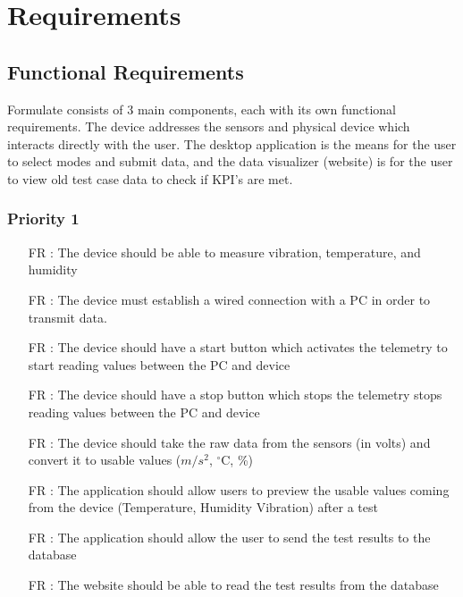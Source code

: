 \documentclass[12pt]{article}
\newcounter{reqnum} %
\begin{document}
  \newpage

\section{Requirements}

\subsection{Functional Requirements}
Formulate consists of 3 main components, each with its own functional requirements. The device addresses the sensors and physical device which interacts directly with the user. The desktop application is the means for the user to select modes and submit data, and the data visualizer (website) is for the user to view old test case data to check if KPI's are met.



\subsubsection{Priority 1} 

\begin{itemize}
  
  \item[FR \refstepcounter{reqnum}\thereqnum:] The device should be able to measure vibration, temperature, and humidity
  
  \item[FR \refstepcounter{reqnum}\thereqnum:] The device must establish a wired connection with a PC in order to transmit data.
  
  \item[FR \refstepcounter{reqnum}\thereqnum:] The device should have a start button which activates the telemetry to start reading values between the PC and device 
  
  \item[FR \refstepcounter{reqnum}\thereqnum:] The device should have a stop button which stops the telemetry stops reading values between the PC and device
  
  \item[FR \refstepcounter{reqnum}\thereqnum:] The device should take the raw data from the sensors (in volts) and convert it to usable values ($m/s^2$, $^\circ$C, \%)
  
  \item[FR \refstepcounter{reqnum}\thereqnum:] The application should allow users to preview the usable values coming from the device (Temperature, Humidity Vibration) after a test

  \item[FR \refstepcounter{reqnum}\thereqnum:] The application should allow the user to send the test results to the database
  
  \item[FR \refstepcounter{reqnum}\thereqnum:] The website should be able to read the test results from the database
  
  \end{itemize}
\end{document}
